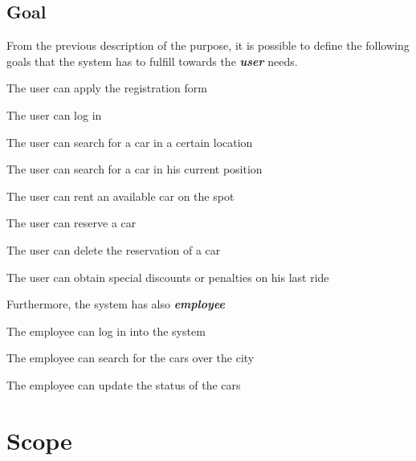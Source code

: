 \documentclass[11pt,a4paper]{report}
\begin{document}
\subsection{Goal}
From the previous description of the purpose, it is possible to define the following goals that the system has to fulfill towards the \textit{\textbf{user}} needs.
\begin{Goal}
\item {} {The user can apply the registration form}
\item {} {The user can log in}
\item {} {The user can search for a car in a certain location}
\item {} {The user can search for a car in his current position}
\item {} {The user can rent an available car on the spot}
\item {} {The user can reserve a car}
\item {} {The user can delete the reservation of a car}
\item {} {The user can obtain special discounts or penalties on his last ride}
\end{Goal}
Furthermore, the system has also  \textbf{\textit{employee}}
\begin{Goal}[resume]
\item {} The employee can log in into the system
\item {} The employee can search for the cars over the city
\item {} The employee can update the status of the cars
\end{Goal}

\section{Scope}
\end{document}
